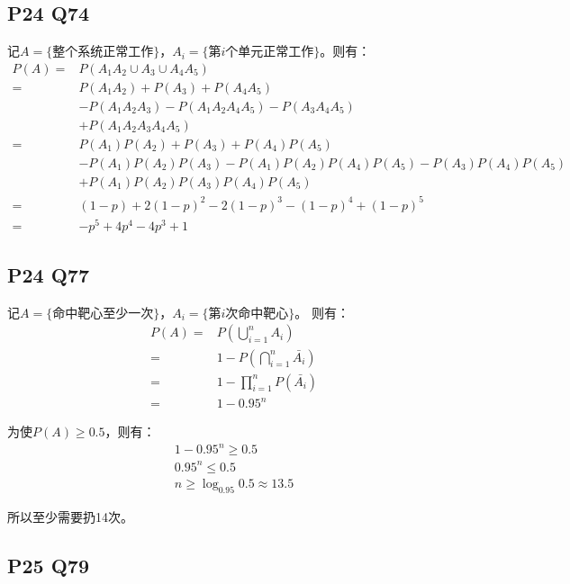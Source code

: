 \documentclass[a4paper,12pt]{ctexart}
\begin{document}
\subsection*{P24 Q74}
记$A = \{\text{整个系统正常工作}\}$，$A_i= \{\text{第}i\text{个单元正常工作}\}$。则有：
\begin{align*}
	P(A) =& P(A_1A_2\cup A_3\cup A_4A_5)\\
	=& P(A_1A_2) + P(A_3) + P(A_4A_5)\\
	 &- P(A_1A_2A_3) - P(A_1A_2A_4A_5) - P(A_3A_4A_5) \\
	 &+ P(A_1A_2A_3A_4A_5)\\
	=& P(A_1)P(A_2) + P(A_3) + P(A_4)P(A_5)\\
	 &- P(A_1)P(A_2)P(A_3) - P(A_1)P(A_2)P(A_4)P(A_5) - P(A_3)P(A_4)P(A_5)\\
	 &+ P(A_1)P(A_2)P(A_3)P(A_4)P(A_5)\\
	=& (1-p) + 2(1-p)^2 -2(1-p)^3 - (1-p)^4 + (1-p)^5\\
	=& -p^5 + 4p^4 - 4p^3 + 1
\end{align*}

\subsection*{P24 Q77}
记$A = \{\text{命中靶心至少一次}\}$，$A_i= \{\text{第}i\text{次命中靶心}\}$。
则有：
\begin{align*}
	P(A) =& P(\bigcup_{i=1}^n A_i)\\
	=& 1 - P(\bigcap_{i=1}^n \bar{A_i})\\
	=& 1 - \prod_{i=1}^n P(\bar{A_i})\\
	=& 1 - 0.95^n
\end{align*}

为使$P(A) \geq 0.5$，则有：
\begin{align*}
	1 - 0.95^n \geq 0.5\\
	0.95^n \leq 0.5\\
	n \geq \log_{0.95}0.5 \approx 13.5
\end{align*}

所以至少需要扔14次。

\subsection*{P25 Q79}
\end{document}
